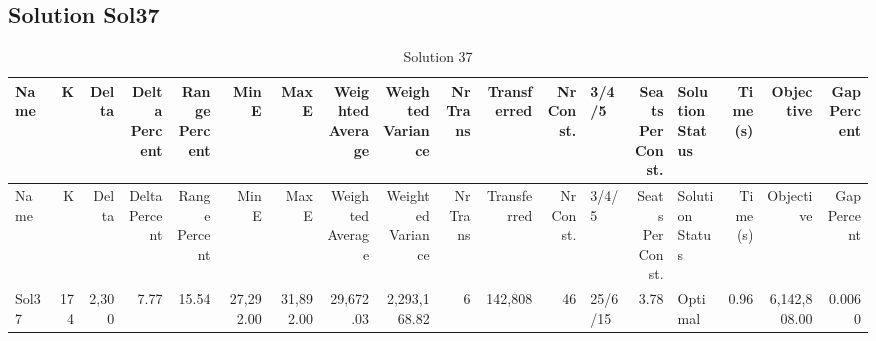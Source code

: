 \documentclass[a4paper]{article}
\begin{document}
\clearpage
\subsection{Solution Sol37}

{\scriptsize
\begin{longtable}{lrrrrrrrrrrrlrlrrr}
\caption{Solution 37}
\\ \toprule
Name &K &Delta &\shortstack{Delta\\Percent} &\shortstack{Range\\Percent} &Min E &Max E &\shortstack{Weighted\\Average} &\shortstack{Weighted\\Variance} &\shortstack{Nr\\Trans} &Transferred &\shortstack{Nr\\Const.} &3/4/5 &\shortstack{Seats\\Per\\Const.} &\shortstack{Solution\\Status} &\shortstack{Time\\(s)} &Objective &\shortstack{Gap\\Percent} \\ \midrule
\endfirsthead
\toprule
Name &K &Delta &\shortstack{Delta\\Percent} &\shortstack{Range\\Percent} &Min E &Max E &\shortstack{Weighted\\Average} &\shortstack{Weighted\\Variance} &\shortstack{Nr\\Trans} &Transferred &\shortstack{Nr\\Const.} &3/4/5 &\shortstack{Seats\\Per\\Const.} &\shortstack{Solution\\Status} &\shortstack{Time\\(s)} &Objective &\shortstack{Gap\\Percent} \\ \midrule
\endhead
\bottomrule
\endfoot
Sol37&174&2,300& 7.77&15.54&27,292.00&31,892.00&29,672.03&2,293,168.82&6&142,808&46&25/6/15& 3.78&Optimal& 0.96&6,142,808.00&0.0060\\ 
\end{longtable}

}
\end{document}
